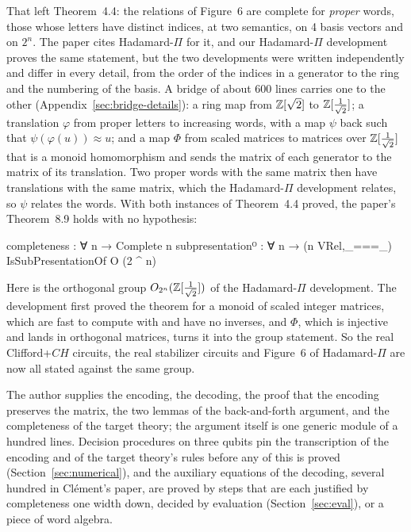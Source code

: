 That left Theorem~4.4: the relations of Figure~6 are complete for
\emph{proper} words, those whose letters have distinct indices, at two
semantics, on 4 basis vectors and on $2^n$. The paper cites
Hadamard-$\Pi$ for it, and our Hadamard-$\Pi$ development proves the
same statement, but the two developments were written independently
and differ in every detail, from the order of the indices in a
generator to the ring and the numbering of the basis. A bridge of
about 600 lines carries one to the other
(Appendix~\ref{sec:bridge-details}): a ring map from $\mathbb{Z}[\sqrt2]$ to
$\mathbb{Z}[\frac1{\sqrt2}]$; a translation $\varphi$ from proper letters to
increasing words, with a map $\psi$ back such that
$\psi(\varphi(u))\approx u$; and a map $\Phi$ from scaled matrices to
matrices over $\mathbb{Z}[\frac1{\sqrt2}]$ that is a monoid homomorphism and
sends the matrix of each generator to the matrix of its translation.
Two proper words with the same matrix then have translations with the
same matrix, which the Hadamard-$\Pi$ development relates, so $\psi$
relates the words. With both instances of Theorem~4.4 proved, the
paper's Theorem~8.9 holds with no hypothesis:
\begin{agdacode}
completeness : ∀ n → Complete n
subpresentationᴼ : ∀ n → (n VRel,_===_) IsSubPresentationOf O (2 ^ n)
\end{agdacode}
Here  is the orthogonal group
$O_{2^n}(\mathbb{Z}[\frac1{\sqrt2}])$ of the Hadamard-$\Pi$ development. The
development first proved the theorem for a monoid of scaled integer
matrices, which are fast to compute with and have no inverses, and
$\Phi$, which is injective and lands in orthogonal matrices, turns it
into the group statement. So the real Clifford+$CH$ circuits, the real
stabilizer circuits and Figure~6 of Hadamard-$\Pi$ are now all stated
against the same group.

The author supplies the encoding, the decoding, the proof that the
encoding preserves the matrix, the two lemmas of the back-and-forth
argument, and the completeness of the target theory; the argument
itself is one generic module of a hundred lines. Decision procedures on
three qubits pin the transcription of the encoding and of the target
theory's rules before any of this is proved
(Section~\ref{sec:numerical}), and the auxiliary equations of the
decoding, several hundred in Cl\'ement's paper, are proved by steps
that are each justified by completeness one width down, decided by
evaluation (Section~\ref{sec:eval}), or a piece of word algebra.

